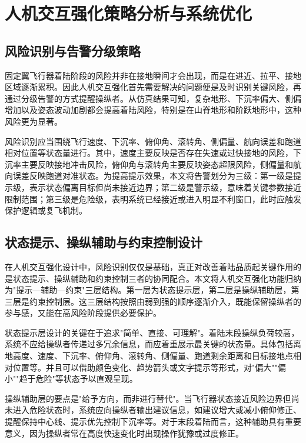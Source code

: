\chapter{人机交互强化策略分析与系统优化}

\section{风险识别与告警分级策略}

固定翼飞行器着陆阶段的风险并非在接地瞬间才会出现，而是在进近、拉平、接地区域逐渐累积。因此人机交互强化首先需要解决的问题便是及时识别关键风险，再通过分级告警的方式提醒操纵者。从仿真结果可知，复杂地形、下沉率偏大、侧偏增加以及姿态波动加剧都会提高着陆风险，特别是在山脊地形和阶跃地形中，这种风险更为显著。

风险识别应当围绕飞行速度、下沉率、俯仰角、滚转角、侧偏量、航向误差和跑道相对位置等状态量进行。其中，速度主要反映是否存在失速或过快接地的风险，下沉率主要反映接地冲击风险，俯仰角与滚转角主要反映姿态超限风险，侧偏量和航向误差反映跑道对准状态。为提高提示效果，本文将告警划分为三级：第一级是提示级，表示状态偏离目标但尚未接近边界；第二级是警示级，意味着关键参数接近限制范围；第三级是危险级，表明系统已经接近或进入明显不利窗口，此时应触发保护逻辑或复飞机制。

\section{状态提示、操纵辅助与约束控制设计}

在人机交互强化设计中，风险识别仅仅是基础，真正对改善着陆品质起关键作用的是状态提示、操纵辅助和约束控制三者的协同配合。本文将人机交互强化功能归纳为"提示—辅助—约束"三层结构。第一层为状态提示层，第二层是操纵辅助层，第三层是约束控制层。这三层结构按照由弱到强的顺序逐渐介入，既能保留操纵者的参与感，又能在高风险阶段提供必要保护。

状态提示层设计的关键在于追求"简单、直接、可理解"。着陆末段操纵负荷较高，系统不应给操纵者传递过多冗余信息，而应着重展示最关键的状态量。具体包括离地高度、速度、下沉率、俯仰角、滚转角、侧偏量、跑道剩余距离和目标接地点相对位置等。并且可以借助颜色变化、趋势箭头或文字提示等形式，对"偏大""偏小""趋于危险"等状态予以直观呈现。

操纵辅助层的要点是"给予方向，而非进行替代"。当飞行器状态接近风险边界但尚未进入危险状态时，系统应向操纵者输出建议信息，如建议增大或减小俯仰修正、提醒保持中心线、提示优先控制下沉率等。对于末段着陆而言，这种辅助具有重要意义，因为操纵者常在高度快速变化时出现操作犹豫或过度修正。

